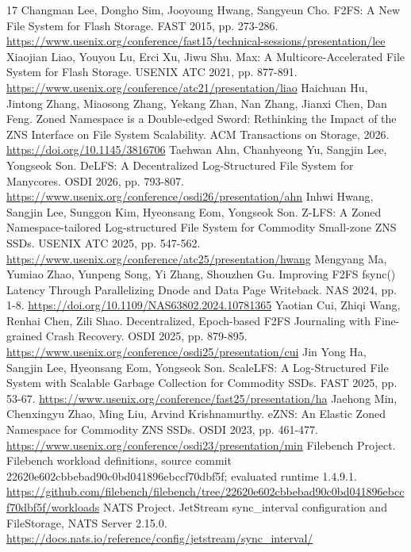 \begin{thebibliography}{17}
 Changman Lee, Dongho Sim, Jooyoung Hwang, Sangyeun Cho. F2FS: A New File System for Flash Storage. FAST 2015, pp. 273-286. \url{https://www.usenix.org/conference/fast15/technical-sessions/presentation/lee}
 Xiaojian Liao, Youyou Lu, Erci Xu, Jiwu Shu. Max: A Multicore-Accelerated File System for Flash Storage. USENIX ATC 2021, pp. 877-891. \url{https://www.usenix.org/conference/atc21/presentation/liao}
 Haichuan Hu, Jintong Zhang, Miaosong Zhang, Yekang Zhan, Nan Zhang, Jianxi Chen, Dan Feng. Zoned Namespace is a Double-edged Sword: Rethinking the Impact of the ZNS Interface on File System Scalability. ACM Transactions on Storage, 2026. \url{https://doi.org/10.1145/3816706}
 Taehwan Ahn, Chanhyeong Yu, Sangjin Lee, Yongseok Son. DeLFS: A Decentralized Log-Structured File System for Manycores. OSDI 2026, pp. 793-807. \url{https://www.usenix.org/conference/osdi26/presentation/ahn}
 Inhwi Hwang, Sangjin Lee, Sunggon Kim, Hyeonsang Eom, Yongseok Son. Z-LFS: A Zoned Namespace-tailored Log-structured File System for Commodity Small-zone ZNS SSDs. USENIX ATC 2025, pp. 547-562. \url{https://www.usenix.org/conference/atc25/presentation/hwang}
 Mengyang Ma, Yumiao Zhao, Yunpeng Song, Yi Zhang, Shouzhen Gu. Improving F2FS fsync() Latency Through Parallelizing Dnode and Data Page Writeback. NAS 2024, pp. 1-8. \url{https://doi.org/10.1109/NAS63802.2024.10781365}
 Yaotian Cui, Zhiqi Wang, Renhai Chen, Zili Shao. Decentralized, Epoch-based F2FS Journaling with Fine-grained Crash Recovery. OSDI 2025, pp. 879-895. \url{https://www.usenix.org/conference/osdi25/presentation/cui}
 Jin Yong Ha, Sangjin Lee, Hyeonsang Eom, Yongseok Son. ScaleLFS: A Log-Structured File System with Scalable Garbage Collection for Commodity SSDs. FAST 2025, pp. 53-67. \url{https://www.usenix.org/conference/fast25/presentation/ha}
 Jaehong Min, Chenxingyu Zhao, Ming Liu, Arvind Krishnamurthy. eZNS: An Elastic Zoned Namespace for Commodity ZNS SSDs. OSDI 2023, pp. 461-477. \url{https://www.usenix.org/conference/osdi23/presentation/min}
 Filebench Project. Filebench workload definitions, source commit 22620e602cbbebad90c0bd041896ebccf70dbf5f; evaluated runtime 1.4.9.1. \url{https://github.com/filebench/filebench/tree/22620e602cbbebad90c0bd041896ebccf70dbf5f/workloads}
 NATS Project. JetStream sync\_interval configuration and FileStorage, NATS Server 2.15.0. \url{https://docs.nats.io/reference/config/jetstream/sync_interval/}

\end{thebibliography}
